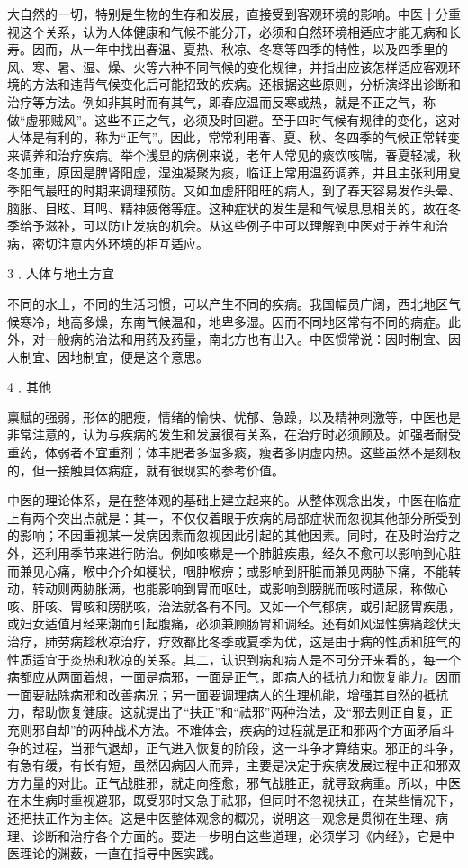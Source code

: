 \documentclass[12pt,UTF8]{ctexbook}
\begin{document}
大自然的一切，特别是生物的生存和发展，直接受到客观环境的影响。中医十分重视这个关系，认为人体健康和气候不能分开，必须和自然环境相适应才能无病和长寿。因而，从一年中找出春温、夏热、秋凉、冬寒等四季的特性，以及四季里的风、寒、暑、湿、燥、火等六种不同气候的变化规律，并指出应该怎样适应客观环境的方法和违背气候变化后可能招致的疾病。还根据这些原则，分析演绎出诊断和治疗等方法。例如非其时而有其气，即春应温而反寒或热，就是不正之气，称做“虚邪贼风”。这些不正之气，必须及时回避。至于四时气候有规律的变化，这对人体是有利的，称为“正气”。因此，常常利用春、夏、秋、冬四季的气候正常转变来调养和治疗疾病。举个浅显的病例来说，老年人常见的痰饮咳喘，春夏轻减，秋冬加重，原因是脾肾阳虚，湿浊凝聚为痰，临证上常用温药调养，并且主张利用夏季阳气最旺的时期来调理预防。又如血虚肝阳旺的病人，到了春天容易发作头晕、脑胀、目眩、耳鸣、精神疲倦等症。这种症状的发生是和气候息息相关的，故在冬季给予滋补，可以防止发病的机会。从这些例子中可以理解到中医对于养生和治病，密切注意内外环境的相互适应。

3﹒人体与地土方宜

不同的水土，不同的生活习惯，可以产生不同的疾病。我国幅员广阔，西北地区气候寒冷，地高多燥，东南气候温和，地卑多湿。因而不同地区常有不同的病症。此外，对一般病的治法和用药及药量，南北方也有出入。中医惯常说：因时制宜、因人制宜、因地制宜，便是这个意思。

4﹒其他

禀赋的强弱，形体的肥瘦，情绪的愉快、忧郁、急躁，以及精神刺激等，中医也是非常注意的，认为与疾病的发生和发展很有关系，在治疗时必须顾及。如强者耐受重药，体弱者不宜重剂；体丰肥者多湿多痰，瘦者多阴虚内热。这些虽然不是刻板的，但一接触具体病症，就有很现实的参考价值。

中医的理论体系，是在整体观的基础上建立起来的。从整体观念出发，中医在临症上有两个突出点就是：其一，不仅仅着眼于疾病的局部症状而忽视其他部分所受到的影响；不因重视某一发病因素而忽视因此引起的其他因素。同时，在及时治疗之外，还利用季节来进行防治。例如咳嗽是一个肺脏疾患，经久不愈可以影响到心脏而兼见心痛，喉中介介如梗状，咽肿喉痹；或影响到肝脏而兼见两胁下痛，不能转动，转动则两胁胀满，也能影响到胃而呕吐，或影响到膀胱而咳时遗尿，称做心咳、肝咳、胃咳和膀胱咳，治法就各有不同。又如一个气郁病，或引起肠胃疾患，或妇女适值月经来潮而引起腹痛，必须兼顾肠胃和调经。还有如风湿性痹痛趁伏天治疗，肺劳病趁秋凉治疗，疗效都比冬季或夏季为优，这是由于病的性质和脏气的性质适宜于炎热和秋凉的关系。其二，认识到病和病人是不可分开来看的，每一个病都应从两面着想，一面是病邪，一面是正气，即病人的抵抗力和恢复能力。因而一面要祛除病邪和改善病况；另一面要调理病人的生理机能，增强其自然的抵抗力，帮助恢复健康。这就提出了“扶正”和“祛邪”两种治法，及“邪去则正自复，正充则邪自却”的两种战术方法。不难体会，疾病的过程就是正和邪两个方面矛盾斗争的过程，当邪气退却，正气进入恢复的阶段，这一斗争才算结束。邪正的斗争，有急有缓，有长有短，虽然因病因人而异，主要是决定于疾病发展过程中正和邪双方力量的对比。正气战胜邪，就走向痊愈，邪气战胜正，就导致病重。所以，中医在未生病时重视避邪，既受邪时又急于祛邪，但同时不忽视扶正，在某些情况下，还把扶正作为主体。这是中医整体观念的概况，说明这一观念是贯彻在生理、病理、诊断和治疗各个方面的。要进一步明白这些道理，必须学习《内经》，它是中医理论的渊薮，一直在指导中医实践。
\end{document}
